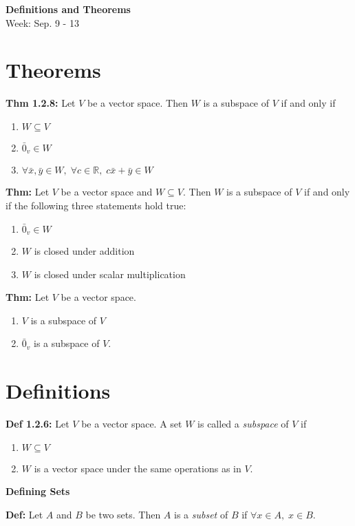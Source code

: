 \noindent
\textbf{\LARGE Definitions and Theorems} \\
\Large Week: Sep. 9 - 13

\section{Theorems}

\textbf{Thm 1.2.8:} Let $V$ be a vector space. Then $W$ is a subspace of $V$ if and only if 
\begin{enumerate}
    \item $W \subseteq V$
    \item $\bar 0_v \in W$
    \item $\forall \bar x, \bar y \in W, \; \forall c \in \mathbb{R}, \; c \bar x + \bar y \in W$
\end{enumerate}

\bigskip
\noindent
\textbf{Thm:} Let $V$ be a vector space and $W \subseteq V$. Then $W$ is a subspace of $V$ if and only if the following three statements hold true:
\begin{enumerate}
    \item $\bar 0_v \in W$
    \item $W$ is closed under addition
    \item $W$ is closed under scalar multiplication
\end{enumerate}

\bigskip
\noindent
\textbf{Thm:} Let $V$ be a vector space. 
\begin{enumerate}
    \item $V$ is a subspace of $V$
    \item {$\bar 0_v$} is a subspace of $V$.
\end{enumerate}

\pagebreak
\section{Definitions}

\textbf{Def 1.2.6:} Let $V$ be a vector space. A set $W$ is called a \textit{subspace} of $V$ if
\begin{enumerate}
    \item $W \subseteq V$
    \item $W$ is a vector space under the same operations as in $V$.
\end{enumerate}

\bigskip
\noindent
\textbf{Defining Sets}

\textbf{Def:} Let $A$ and $B$ be two sets. Then $A$ is a \textit{subset} of $B$ if $\forall x \in A, \; x \in B$. 

